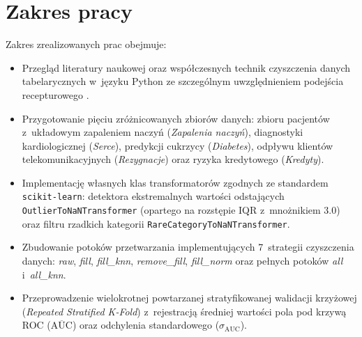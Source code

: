 \section{Zakres pracy}
Zakres zrealizowanych prac obejmuje:
\begin{itemize}
    \item Przegląd literatury naukowej oraz współczesnych technik czyszczenia danych tabelarycznych w~języku Python ze szczególnym uwzględnieniem podejścia recepturowego \cite{Walker2021}.
    \item Przygotowanie pięciu zróżnicowanych zbiorów danych: zbioru pacjentów z~układowym zapaleniem naczyń (\textit{Zapalenia naczyń}), diagnostyki kardiologicznej (\textit{Serce}), predykcji cukrzycy (\textit{Diabetes}), odpływu klientów telekomunikacyjnych (\textit{Rezygnacje}) oraz ryzyka kredytowego (\textit{Kredyty}).
    \item Implementację własnych klas transformatorów zgodnych ze standardem \texttt{scikit-learn}: detektora ekstremalnych wartości odstających \texttt{OutlierToNaNTransformer} (opartego na rozstępie IQR z~mnożnikiem 3.0) oraz filtru rzadkich kategorii \texttt{RareCategoryToNaNTransformer}.
    \item Zbudowanie potoków przetwarzania implementujących 7~strategii czyszczenia danych: \textit{raw}, \textit{fill}, \textit{fill\_knn}, \textit{remove\_fill}, \textit{fill\_norm} oraz pełnych potoków \textit{all} i~\textit{all\_knn}.
    \item Przeprowadzenie wielokrotnej powtarzanej stratyfikowanej walidacji krzyżowej (\textit{Repeated Stratified K-Fold}) z~rejestracją średniej wartości pola pod krzywą ROC ($\overline{\mathrm{AUC}}$) oraz odchylenia standardowego ($\sigma_{\mathrm{AUC}}$).
\end{itemize}

